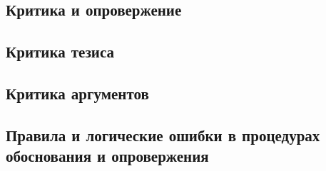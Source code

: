 \documentclass[main.tex]{subfiles}
\begin{document}

\subsection{Критика и опровержение}


\subsection{Критика тезиса}


\subsection{Критика аргументов}


\subsection{Правила и логические ошибки в процедурах обоснования и опровержения}

\end{document}
